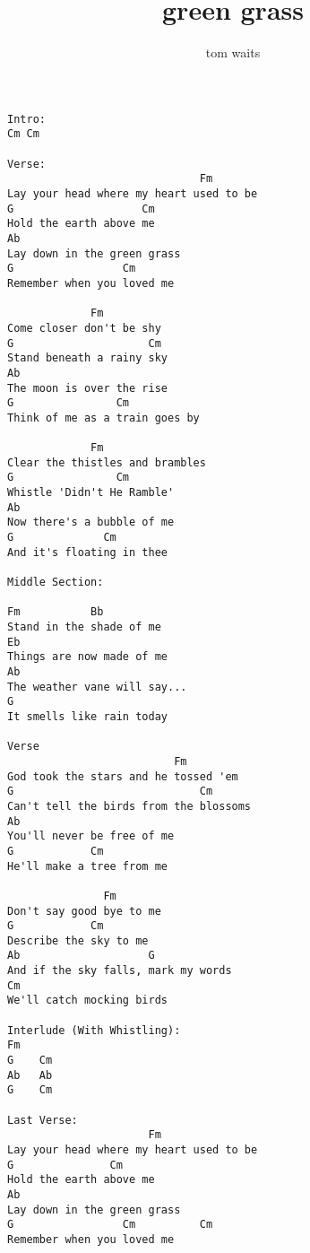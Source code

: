 \author{tom waits}
\title{green grass}
\maketitle
\begin{verbatim}
Intro:
Cm Cm

Verse:
                              Fm 
Lay your head where my heart used to be
G                    Cm  
Hold the earth above me
Ab
Lay down in the green grass
G                 Cm 
Remember when you loved me

             Fm 
Come closer don't be shy
G                     Cm        
Stand beneath a rainy sky
Ab   
The moon is over the rise
G                Cm
Think of me as a train goes by

             Fm
Clear the thistles and brambles
G                Cm
Whistle 'Didn't He Ramble'
Ab
Now there's a bubble of me
G              Cm
And it's floating in thee

Middle Section:

Fm           Bb
Stand in the shade of me
Eb
Things are now made of me
Ab
The weather vane will say...
G
It smells like rain today

Verse
                          Fm
God took the stars and he tossed 'em
G                             Cm
Can't tell the birds from the blossoms
Ab
You'll never be free of me
G            Cm
He'll make a tree from me

               Fm
Don't say good bye to me
G            Cm
Describe the sky to me
Ab                    G
And if the sky falls, mark my words
Cm
We'll catch mocking birds

Interlude (With Whistling):
Fm  
G    Cm
Ab   Ab
G    Cm

Last Verse:
                      Fm
Lay your head where my heart used to be
G               Cm
Hold the earth above me
Ab
Lay down in the green grass
G                 Cm          Cm
Remember when you loved me
\end{verbatim}